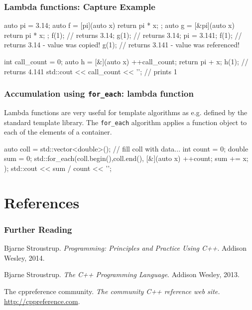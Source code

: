 \documentclass[aspectratio=169,ignorenonframetext,11pt]{beamer}
\def\inline{\lstinline[basicstyle=\small\ttfamily]}
\begin{document}
\begin{frame}[fragile]
\frametitle{Lambda functions: Capture Example}
\begin{cppcode}
auto pi = 3.14;
auto f = [pi](auto x) { return pi * x; };
auto g = [&pi](auto x) { return pi * x; };
f(1); // returns 3.14;
g(1); // returns 3.14;
pi = 3.141;
f(1); // returns 3.14 - value was copied!
g(1); // returns 3.141 - value was referenced!

int call_count = 0;
auto h = [&](auto x) {
  ++call_count;
  return pi + x;
}
h(1); // returns 4.141
std::cout << call_count << '\n'; // prints 1
\end{cppcode}

\end{frame}

\begin{frame}[fragile] \frametitle{Accumulation using
    \inline!for_each!: lambda function}

Lambda functions are very useful for template algorithms as e.g. defined by the standard template library. The \inline!for_each! algorithm applies a function object to each of the elements of a container.

\vspace*{2em}

  \begin{cppcode}
auto coll = std::vector<double>();
// fill coll with data...
int count = 0;
double sum = 0;
std::for_each(coll.begin(),coll.end(),
              [&](auto x){ ++count; sum += x; } );
std::cout << sum / count << '\n';
  \end{cppcode}
\end{frame}



\section{References}

\begin{frame} \frametitle<presentation>{Further Reading}

\begin{thebibliography}{Vandervoorde and Josuttis(2003)}

Bjarne Stroustrup.
\newblock \emph{Programming: Principles and Practice Using C++}.
\newblock Addison Wesley, 2014.

Bjarne Stroustrup.
\newblock \emph{The C++ Programming Language}.
\newblock Addison Wesley, 2013.

The cppreference community.
\newblock \emph{The community C++ reference web site.}
\newblock \alert<2>{\url{http://cppreference.com}}.

\end{thebibliography}
\end{frame}
\end{document}
